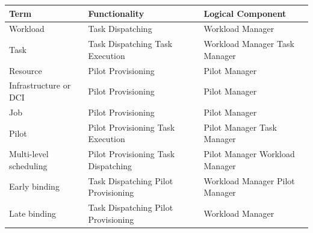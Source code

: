 \documentclass{sig-alternate}
\begin{document}
\begin{table}
 \centering
 \begin{tabular}{|p{4cm}|p{3.2cm}|p{3.2cm}|}
  \hline
    \textbf{Term} &
    \textbf{Functionality} &
    \textbf{Logical Component} \\
  \hline
  \hline
    \textcolor{term}{Workload} &
    \textcolor{funct}{Task Dispatching} &
    \textcolor{lcomp}{Workload Manager} \\
  \hline
    \textcolor{term}{Task} &
    \textcolor{funct}{Task Dispatching} \newline
      \textcolor{funct}{Task Execution} &
    \textcolor{lcomp}{Workload Manager} \newline
      \textcolor{lcomp}{Task Manager} \\
  \hline
    \textcolor{term}{Resource} &
    \textcolor{funct}{Pilot Provisioning} &
    \textcolor{lcomp}{Pilot Manager} \\
  \hline
    \textcolor{term}{Infrastructure} or \textcolor{term}{DCI} &
    \textcolor{funct}{Pilot Provisioning} &
    \textcolor{lcomp}{Pilot Manager} \\
  \hline
    \textcolor{term}{Job} &
    \textcolor{funct}{Pilot Provisioning} &
    \textcolor{lcomp}{Pilot Manager} \\
  \hline
    \textcolor{term}{Pilot} &
    \textcolor{funct}{Pilot Provisioning} \newline
      \textcolor{funct}{Task Execution} &
    \textcolor{lcomp}{Pilot Manager} \newline
      \textcolor{lcomp}{Task Manager} \\
  \hline
    \textcolor{term}{Multi-level scheduling} &
    \textcolor{funct}{Pilot Provisioning} \newline
      \textcolor{funct}{Task Dispatching} &
    \textcolor{lcomp}{Pilot Manager} \newline
      \textcolor{lcomp}{Workload Manager} \\
  \hline
    \textcolor{term}{Early binding} &
    \textcolor{funct}{Task Dispatching} \newline
      \textcolor{funct}{Pilot Provisioning} &
    \textcolor{lcomp}{Workload Manager} \newline
      \textcolor{lcomp}{Pilot Manager} \\
  \hline
    \textcolor{term}{Late binding} &
    \textcolor{funct}{Task Dispatching} \newline
      \textcolor{funct}{Pilot Provisioning} &
    \textcolor{lcomp}{Workload Manager} \newline

\end{tabular}
\end{table}
\end{document}
